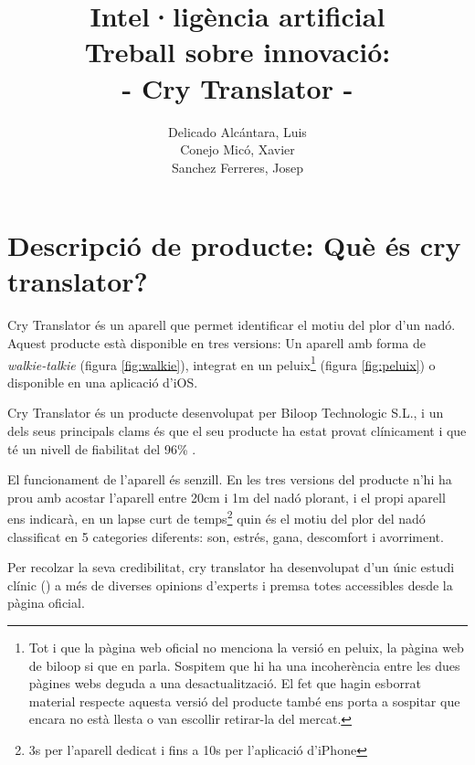 \documentclass[11pt,a4paper]{article}
\author{
  Delicado Alcántara, Luis
  \\
  Conejo Micó, Xavier
  \\
  Sanchez Ferreres, Josep
}
\title{\Huge {Intel·ligència artificial}\\\medskip \huge{Treball sobre innovació:\\ - Cry Translator -}}
\begin{document}
\begin{titlepage}
\clearpage\maketitle
\thispagestyle{empty}
\end{titlepage}

\clearpage

\tableofcontents

\newpage

\section[\textsf{Què és Cry Translator?}]{\textsf{Descripció de producte: Què és cry translator?}}
\label{quees}

Cry Translator \cite{official} és un aparell que permet identificar el motiu del plor d'un nadó. Aquest producte està disponible en tres versions: Un aparell amb forma de \emph{walkie-talkie} (figura \ref{fig:walkie}), integrat en un peluix\footnote{Tot i que la pàgina web oficial no menciona la versió en peluix, la pàgina web de biloop si que en parla. Sospitem que hi ha una incoherència entre les dues pàgines webs deguda a una desactualització. El fet que hagin esborrat material respecte aquesta versió del producte també ens porta a sospitar que encara no està llesta o van escollir retirar-la del mercat.} (figura \ref{fig:peluix}) o disponible en una aplicació d'iOS. 

Cry Translator és un producte desenvolupat per Biloop Technologic S.L., i un dels seus principals clams és que el seu producte ha estat provat clínicament \cite{estudi_clinic} i que té un nivell de fiabilitat del 96\% \cite{official} \cite{elmundo}. 

El funcionament de l'aparell és senzill. En les tres versions del producte n'hi ha prou amb acostar l'aparell entre 20cm i 1m del nadó plorant, i el propi aparell ens indicarà, en un lapse curt de temps\footnote{3s per l'aparell dedicat i fins a 10s per l'aplicació d'iPhone} quin és el motiu del plor del nadó classificat en 5 categories diferents: son, estrés, gana, descomfort i avorriment.

Per recolzar la seva credibilitat, cry translator ha desenvolupat d'un únic estudi clínic (\cite{estudi_clinic}) a més de diverses opinions d'experts i premsa totes accessibles desde la pàgina oficial.
\end{document}
